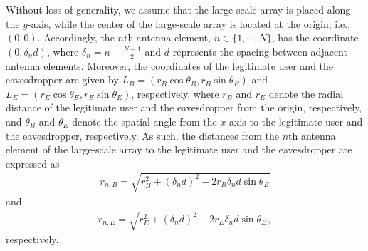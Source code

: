 \documentclass[10pt,technote]{IEEEtran}
\newcommand{\1}{\mathbbm{1}}
\begin{document}
Without loss of generality, we assume that the large-scale array is placed along the $y$-axis, while the center of the large-scale array is located at the origin, i.e., $(0,0)$. Accordingly, the $n$th antenna element, $n\in\{1,\cdots,N\}$, has the coordinate $\left(0,\delta_n d\right)$, where $\delta_n=n-\frac{N-1}{2}$ and $d$ represents the spacing between adjacent antenna elements. Moreover, the coordinates of the legitimate user and the eavesdropper are given by $L_B=\left(r_B\cos\theta_B,r_B\sin\theta_B\right)$ and $L_E = \left(r_E\cos\theta_E,r_E\sin\theta_E\right)$, respectively, where $r_{B}$ and $r_E$ denote the radial distance of the legitimate user and the eavesdropper from the origin, respectively, and $\theta_{B}$ and $\theta_{E}$ denote the spatial angle from the $x$-axis to the legitimate user and the eavesdropper, respectively. As such, the distances from the $n$th antenna element of the large-scale array to the legitimate user and the eavesdropper are expressed as
\begin{align}
r_{n,B} = \sqrt{r_{B}^2+(\delta_n d)^2-2r_B\delta_n d\sin\theta_B}
\end{align}
and
\begin{align}
r_{n,E} = \sqrt{r_{E}^2+(\delta_n d)^2-2r_E\delta_n d\sin\theta_E},
\end{align}
respectively.
\end{document}
